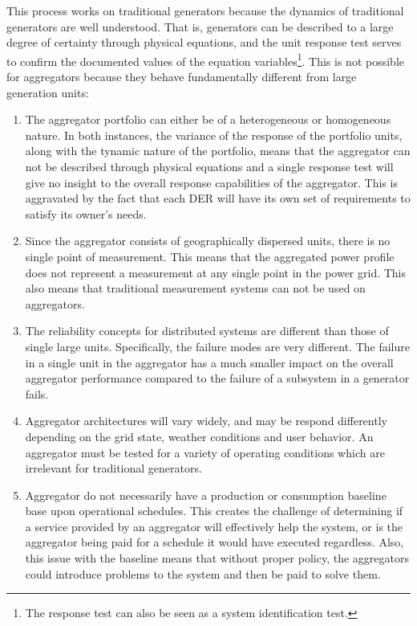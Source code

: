 This process works on traditional generators because the dynamics of traditional generators are well understood. That is, generators can be described to a large degree of certainty through physical equations, and the unit response test serves to confirm the documented values of the equation variables\footnote{The response test can also be seen as a system identification test.}. This is not possible for aggregators because they behave fundamentally different from large generation units:
\begin{enumerate}
	\item The aggregator portfolio can either be of a heterogeneous or homogeneous nature. In both instances, the variance of the response of the portfolio units, along with the tynamic nature of the portfolio, means that the aggregator can not be described through physical equations and a single response test will give no insight to the overall response capabilities of the aggregator. This is aggravated by the fact that each DER will have its own set of requirements to satisfy its owner's needs.
	\item Since the aggregator consists of geographically dispersed units, there is no single point of measurement. This means that the aggregated power profile does not represent a measurement at any single point in the power grid. This also means that traditional measurement systems can not be used on aggregators.
	\item The reliability concepts for distributed systems are different than those of single large units. Specifically, the failure modes are very different. The failure in a single unit in the aggregator has a much smaller impact on the overall aggregator performance compared to the failure of a subsystem in a generator fails.
	\item Aggregator architectures will vary widely, and may be respond differently depending on the grid state, weather conditions and user behavior. An aggregator must be tested for a variety of operating conditions which are irrelevant for traditional generators.
	\item Aggregator do not necessarily have a production or consumption baseline base upon operational schedules. This creates the challenge of determining if a service provided by an aggregator will effectively help the system, or is the aggregator being paid for a schedule it would have executed regardless. Also, this issue with the baseline means that without proper policy, the aggregators could introduce problems to the system and then be paid to solve them.
\end{enumerate}

